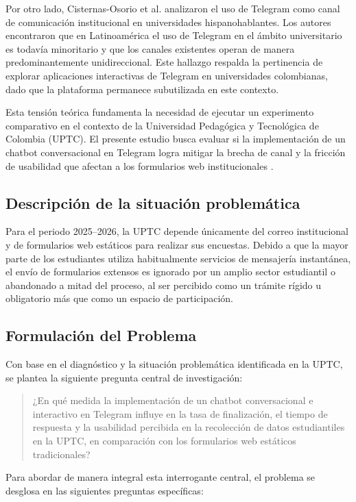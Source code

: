 \documentclass[12pt,letterpaper]{article}
\begin{document}
Por otro lado, Cisternas-Osorio et al. \cite{cisternas2022} analizaron el uso de Telegram como canal de comunicación institucional en universidades hispanohablantes. Los autores encontraron que en Latinoamérica el uso de Telegram en el ámbito universitario es todavía minoritario y que los canales existentes operan de manera predominantemente unidireccional. Este hallazgo respalda la pertinencia de explorar aplicaciones interactivas de Telegram en universidades colombianas, dado que la plataforma permanece subutilizada en este contexto.

Esta tensión teórica fundamenta la necesidad de ejecutar un experimento comparativo en el contexto de la Universidad Pedagógica y Tecnológica de Colombia (UPTC). El presente estudio busca evaluar si la implementación de un chatbot conversacional en Telegram logra mitigar la brecha de canal y la fricción de usabilidad que afectan a los formularios web institucionales \cite{baronsalazar2026, cisternas2022}.

\subsection{Descripción de la situación problemática}
Para el periodo 2025--2026, la UPTC depende únicamente del correo institucional y de formularios web estáticos para realizar sus encuestas. Debido a que la mayor parte de los estudiantes utiliza habitualmente servicios de mensajería instantánea, el envío de formularios extensos es ignorado por un amplio sector estudiantil o abandonado a mitad del proceso, al ser percibido como un trámite rígido u obligatorio más que como un espacio de participación.

\subsection{Formulación del Problema}

Con base en el diagnóstico y la situación problemática identificada en la UPTC, se plantea la siguiente pregunta central de investigación:

\begin{quote}
¿En qué medida la implementación de un chatbot conversacional e interactivo en Telegram influye en la tasa de finalización, el tiempo de respuesta y la usabilidad percibida en la recolección de datos estudiantiles en la UPTC, en comparación con los formularios web estáticos tradicionales?
\end{quote}

Para abordar de manera integral esta interrogante central, el problema se desglosa en las siguientes preguntas específicas:
\end{document}
